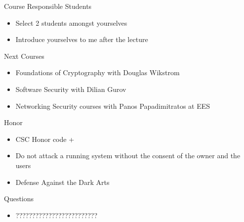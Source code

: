 \documentclass{beamer}
\begin{document}
\begin{frame}{Course Responsible Students }
  \begin{itemize}
  \item Select 2 students amongst yourselves 
  \item Introduce yourselves to me after the lecture 
  \end{itemize}
\end{frame}


\begin{frame}{Next Courses}
  \begin{itemize}
  \item Foundations of Cryptography with Douglas Wikstr\:om
  \item Software Security with Dilian Gurov
  \item Networking Security courses with Panos
    Papadimitratos at EES
  \end{itemize}
\end{frame}

\begin{frame}{Honor}
  \begin{itemize}
  \item CSC Honor code +
  \item \alert{Do not attack a running system 
    without the consent of the owner 
    and the users}
  \item Defense Against the Dark Arts
  \end{itemize}
\end{frame}

\begin{frame}{Questions}
  \begin{itemize}
  \item ?????????????????????????
  \end{itemize}
\end{frame}


\end{document}
